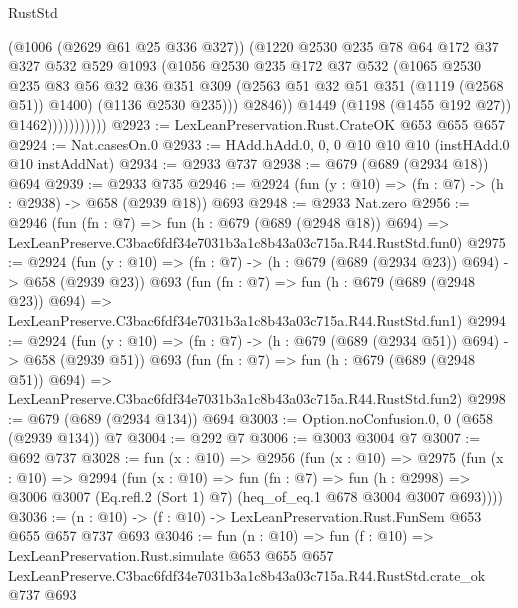 \begin{lexlean}{RustStd}
\begin{coremodule}
                            (@1006 (@2629 @61 @25 @336 @327))
                            (@1220
                              @2530
                              @235
                              @78
                              @64
                              @172
                              @37
                              @327
                              @532
                              @529
                              @1093
                              (@1056
                                @2530
                                @235
                                @172
                                @37
                                @532
                                (@1065
                                  @2530
                                  @235
                                  @83
                                  @56
                                  @32
                                  @36
                                  @351
                                  @309
                                  (@2563 @51 @32 @51 @351 (@1119 (@2568 @51)) @1400)
                                  (@1136 @2530 @235)))
                              @2846))
                          @1449
                          (@1198 (@1455 @192 @27))
                          @1462)))))))))))
@2923 := LexLeanPreservation.Rust.CrateOK @653 @655 @657
@2924 := Nat.casesOn.{0}
@2933 := HAdd.hAdd.{0, 0, 0} @10 @10 @10 (instHAdd.{0} @10 instAddNat)
@2934 := @2933 @737
@2938 := @679 (@689 (@2934 @18)) @694
@2939 := @2933 @735
@2946 := @2924 (fun (y : @10) => (fn : @7) -> (h : @2938) -> @658 (@2939 @18)) @693
@2948 := @2933 Nat.zero
@2956 := @2946
    (fun (fn : @7) =>
    fun (h : @679 (@689 (@2948 @18)) @694) =>
    LexLeanPreserve.C3bac6fdf34e7031b3a1c8b43a03c715a.R44.RustStd.fun0)
@2975 := @2924
    (fun (y : @10) => (fn : @7) -> (h : @679 (@689 (@2934 @23)) @694) -> @658 (@2939 @23))
    @693
    (fun (fn : @7) =>
    fun (h : @679 (@689 (@2948 @23)) @694) =>
    LexLeanPreserve.C3bac6fdf34e7031b3a1c8b43a03c715a.R44.RustStd.fun1)
@2994 := @2924
    (fun (y : @10) => (fn : @7) -> (h : @679 (@689 (@2934 @51)) @694) -> @658 (@2939 @51))
    @693
    (fun (fn : @7) =>
    fun (h : @679 (@689 (@2948 @51)) @694) =>
    LexLeanPreserve.C3bac6fdf34e7031b3a1c8b43a03c715a.R44.RustStd.fun2)
@2998 := @679 (@689 (@2934 @134)) @694
@3003 := Option.noConfusion.{0, 0} (@658 (@2939 @134)) @7
@3004 := @292 @7
@3006 := @3003 @3004 @7
@3007 := @692 @737
@3028 := fun (x : @10) =>
  @2956
    (fun (x : @10) =>
    @2975
      (fun (x : @10) =>
      @2994
        (fun (x : @10) =>
        fun (fn : @7) =>
        fun (h : @2998) =>
        @3006 @3007 (Eq.refl.{2} (Sort 1) @7) (heq_of_eq.{1} @678 @3004 @3007 @693))))
@3036 := (n : @10) -> (f : @10) -> LexLeanPreservation.Rust.FunSem @653 @655 @657 @737 @693
@3046 := fun (n : @10) =>
  fun (f : @10) =>
  LexLeanPreservation.Rust.simulate
    @653
    @655
    @657
    LexLeanPreserve.C3bac6fdf34e7031b3a1c8b43a03c715a.R44.RustStd.crate_ok
    @737
    @693
\end{coremodule}
\end{lexlean}
